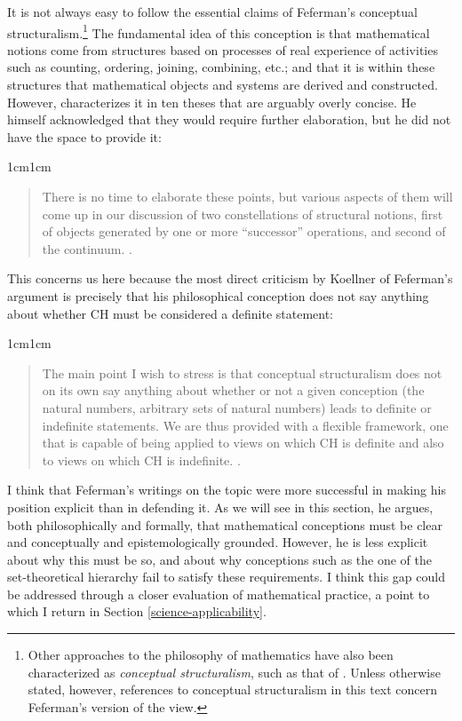 \documentclass[11pt,a4paper]{article}
\theoremstyle{plain}
\begin{document}
It is not always easy to follow the essential claims of Feferman's conceptual structuralism.\footnote{Other approaches to the philosophy of mathematics have also been characterized as \textit{conceptual structuralism}, such as that of \textcite[postnote]{Isaacson2008}. Unless otherwise stated, however, references to conceptual structuralism in this text concern Feferman's version of the view.} The fundamental idea of this conception is that mathematical notions come from structures based on processes of real experience of activities such as counting, ordering, joining, combining, etc.; and that it is within these structures that mathematical objects and systems are derived and constructed. However, \textcite{Feferman2011a} characterizes it in ten theses that are arguably overly concise. He himself acknowledged that they would require further elaboration, but he did not have the space to provide it:

\begin{adjustwidth}{1cm}{1cm}
\begin{quote}
\small
There is no time to elaborate these points, but various aspects of them will come up in our discussion of two constellations of structural notions, first of objects generated by one or more “successor” operations, and second of the continuum. \parencite[p. 12]{Feferman2011a}.
\end{quote}
\end{adjustwidth}

This concerns us here because the most direct criticism by Koellner of Feferman's argument is precisely that his philosophical conception does not say anything about whether CH must be considered a definite statement:

\begin{adjustwidth}{1cm}{1cm}
\begin{quote}
\small
The main point I wish to stress is that conceptual structuralism does not on its own say anything about whether or not a given conception (the natural numbers, arbitrary sets of natural numbers) leads to definite or indefinite statements. We are thus provided with a flexible framework, one that is capable of being applied to views on which CH is definite and also to views on which CH is indefinite. \parencite[p. 10]{Koellner2022}.
\end{quote}
\end{adjustwidth}

I think that Feferman's writings on the topic were more successful in making his position explicit than in defending it. As we will see in this section, he argues, both philosophically and formally, that mathematical conceptions must be clear and conceptually and epistemologically grounded. However, he is less explicit about why this must be so, and about why conceptions such as the one of the set-theoretical hierarchy fail to satisfy these requirements. I think this gap could be addressed through a closer evaluation of mathematical practice, a point to which I return in Section \ref{science-applicability}.
\end{document}
